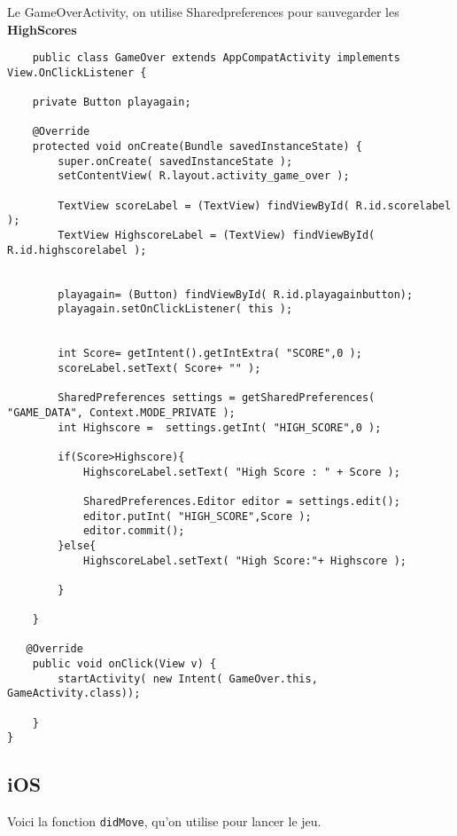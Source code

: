 \documentclass{article}
\begin{document}
\smallskip

Le GameOverActivity, on utilise Sharedpreferences pour sauvegarder les \textbf{HighScores}


\begin{verbatim}
    public class GameOver extends AppCompatActivity implements View.OnClickListener {

    private Button playagain;

    @Override
    protected void onCreate(Bundle savedInstanceState) {
        super.onCreate( savedInstanceState );
        setContentView( R.layout.activity_game_over );

        TextView scoreLabel = (TextView) findViewById( R.id.scorelabel );
        TextView HighscoreLabel = (TextView) findViewById( R.id.highscorelabel );


        playagain= (Button) findViewById( R.id.playagainbutton);
        playagain.setOnClickListener( this );


        int Score= getIntent().getIntExtra( "SCORE",0 );
        scoreLabel.setText( Score+ "" );

        SharedPreferences settings = getSharedPreferences( "GAME_DATA", Context.MODE_PRIVATE );
        int Highscore =  settings.getInt( "HIGH_SCORE",0 );

        if(Score>Highscore){
            HighscoreLabel.setText( "High Score : " + Score );

            SharedPreferences.Editor editor = settings.edit();
            editor.putInt( "HIGH_SCORE",Score );
            editor.commit();
        }else{
            HighscoreLabel.setText( "High Score:"+ Highscore );

        }

    }

   @Override
    public void onClick(View v) {
        startActivity( new Intent( GameOver.this, GameActivity.class));

    }
}
\end{verbatim}



\subsection{iOS} %
\label{section:ios}

Voici la fonction \texttt{didMove}, qu'on utilise pour lancer le jeu.
\end{document}
